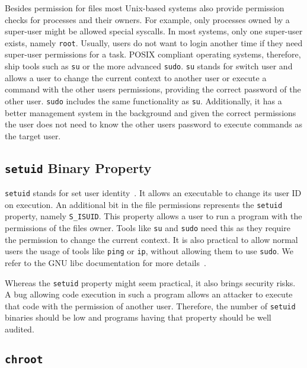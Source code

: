 Besides permission for files most Unix-based systems also provide permission
checks for processes and their owners. For example, only processes owned by a
super-user might be allowed special syscalls. In most systems, only one
super-user exists, namely \texttt{root}. Usually, users do not want to login
another time if they need super-user permissions for a task. POSIX compliant
operating systems, therefore, ship tools such as \texttt{su} or the more
advanced \texttt{sudo}. \texttt{su} stands for switch user and allows a user to
change the current context to another user or execute a command with the other
user\textquotesingle s permissions, providing the correct password of the other
user. \texttt{sudo} includes the same functionality as \texttt{su}.
Additionally, it has a better management system in the background and given the
correct permissions the user does not need to know the other
user\textquotesingle s password to execute commands as the target user.

\subsection{\texttt{setuid} Binary Property}

\texttt{setuid} stands for \textquotedbl set user
identity\textquotedbl~\cite{ogroupsetuid}. It allows an executable to change its
user ID on execution. An additional bit in the file permissions represents the
\texttt{setuid} property, namely \texttt{S\_ISUID}. This property allows a user
to run a program with the permissions of the file\textquotesingle s owner. Tools
like \texttt{su} and \texttt{sudo} need this as they require the permission to
change the current context. It is also practical to allow normal users the usage
of tools like \texttt{ping} or \texttt{ip}, without allowing them to use
\texttt{sudo}. We refer to the GNU libc documentation for more
details~\cite{libcpermission}.

Whereas the \texttt{setuid} property might seem practical, it also brings
security risks. A bug allowing code execution in such a program allows an
attacker to execute that code with the permission of another user. Therefore,
the number of \texttt{setuid} binaries should be low and programs having that
property should be well audited.

\subsection{\texttt{chroot}}

